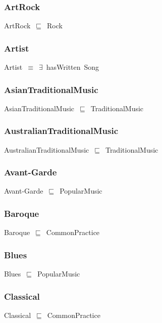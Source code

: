 \documentclass{article}
\begin{document}
\subsubsection*{ArtRock}

ArtRock~\ensuremath{\sqsubseteq}~Rock~

\subsubsection*{Artist}

Artist~\ensuremath{\equiv}~\ensuremath{\exists}~hasWritten~Song

\subsubsection*{AsianTraditionalMusic}

AsianTraditionalMusic~\ensuremath{\sqsubseteq}~TraditionalMusic~

\subsubsection*{AustralianTraditionalMusic}

AustralianTraditionalMusic~\ensuremath{\sqsubseteq}~TraditionalMusic~

\subsubsection*{Avant-Garde}

Avant-Garde~\ensuremath{\sqsubseteq}~PopularMusic~

\subsubsection*{Baroque}

Baroque~\ensuremath{\sqsubseteq}~CommonPractice~

\subsubsection*{Blues}

Blues~\ensuremath{\sqsubseteq}~PopularMusic~

\subsubsection*{Classical}

Classical~\ensuremath{\sqsubseteq}~CommonPractice~
\end{document}

